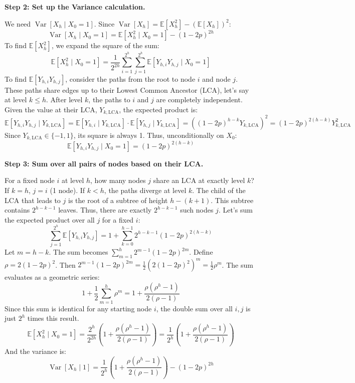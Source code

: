 \begin{solution}
\textbf{Step 2: Set up the Variance calculation.}

We need $\operatorname{Var}[X_h \mid X_0 = 1]$. Since $\operatorname{Var}[X_h] = \mathbb{E}[X_h^2] - (\mathbb{E}[X_h])^2$:
\[ \operatorname{Var}[X_h \mid X_0 = 1] = \mathbb{E}[X_h^2 \mid X_0 = 1] - (1-2p)^{2h} \]
To find $\mathbb{E}[X_h^2]$, we expand the square of the sum:
\[ \mathbb{E}[X_h^2 \mid X_0 = 1] = \frac{1}{2^{2h}} \sum_{i=1}^{2^h} \sum_{j=1}^{2^h} \mathbb{E}[Y_{h,i} Y_{h,j} \mid X_0 = 1] \]
To find $\mathbb{E}[Y_{h,i} Y_{h,j}]$, consider the paths from the root to node $i$ and node $j$. These paths share edges up to their Lowest Common Ancestor (LCA), let's say at level $k \leq h$.
After level $k$, the paths to $i$ and $j$ are completely independent.
Given the value at their LCA, $Y_{k, \text{LCA}}$, the expected product is:
\[ \mathbb{E}[Y_{h,i} Y_{h,j} \mid Y_{k, \text{LCA}}] = \mathbb{E}[Y_{h,i} \mid Y_{k, \text{LCA}}] \cdot \mathbb{E}[Y_{h,j} \mid Y_{k, \text{LCA}}] = ((1-2p)^{h-k} Y_{k, \text{LCA}})^2 = (1-2p)^{2(h-k)} Y_{k, \text{LCA}}^2 \]
Since $Y_{k, \text{LCA}} \in \{-1, 1\}$, its square is always 1. Thus, unconditionally on $X_0$:
\[ \mathbb{E}[Y_{h,i} Y_{h,j} \mid X_0 = 1] = (1-2p)^{2(h-k)} \]

\textbf{Step 3: Sum over all pairs of nodes based on their LCA.}

For a fixed node $i$ at level $h$, how many nodes $j$ share an LCA at exactly level $k$?
If $k=h$, $j=i$ (1 node).
If $k < h$, the paths diverge at level $k$. The child of the LCA that leads to $j$ is the root of a subtree of height $h - (k+1)$. This subtree contains $2^{h-k-1}$ leaves. Thus, there are exactly $2^{h-k-1}$ such nodes $j$.
Let's sum the expected product over all $j$ for a fixed $i$:
\[ \sum_{j=1}^{2^h} \mathbb{E}[Y_{h,i} Y_{h,j}] = 1 + \sum_{k=0}^{h-1} 2^{h-k-1} (1-2p)^{2(h-k)} \]
Let $m = h-k$. The sum becomes $\sum_{m=1}^h 2^{m-1} (1-2p)^{2m}$.
Define $\rho = 2(1-2p)^2$. Then $2^{m-1}(1-2p)^{2m} = \frac{1}{2} (2(1-2p)^2)^m = \frac{1}{2} \rho^m$.
The sum evaluates as a geometric series:
\[ 1 + \frac{1}{2} \sum_{m=1}^h \rho^m = 1 + \frac{\rho(\rho^h - 1)}{2(\rho - 1)} \]
Since this sum is identical for any starting node $i$, the double sum over all $i, j$ is just $2^h$ times this result.
\[ \mathbb{E}[X_h^2 \mid X_0 = 1] = \frac{2^h}{2^{2h}} \left( 1 + \frac{\rho(\rho^h - 1)}{2(\rho - 1)} \right) = \frac{1}{2^h} \left( 1 + \frac{\rho(\rho^h - 1)}{2(\rho - 1)} \right) \]
And the variance is:
\[ \operatorname{Var}[X_h \mid 1] = \frac{1}{2^h} \left( 1 + \frac{\rho(\rho^h - 1)}{2(\rho - 1)} \right) - (1-2p)^{2h} \]


\end{solution}
